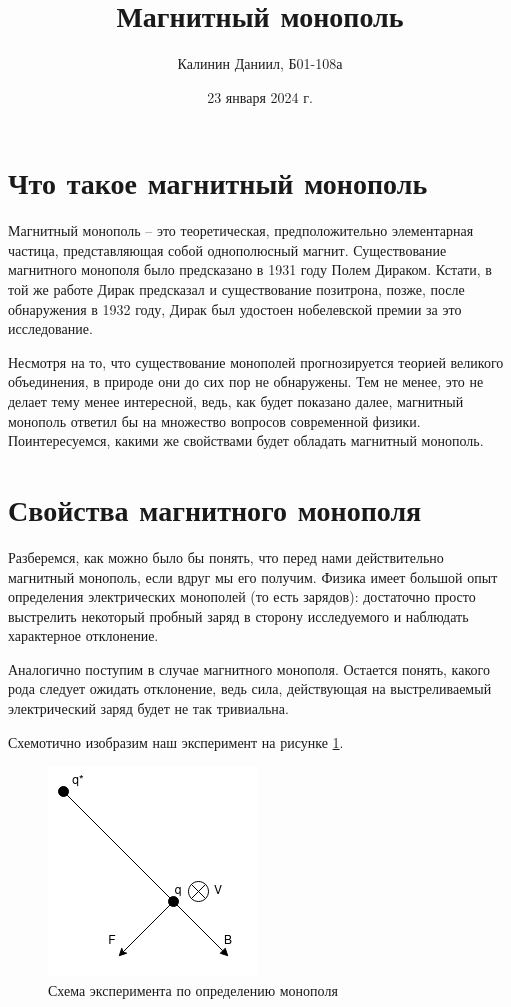 \documentclass[a4paper, 12pt]{article}
\author{Калинин Даниил, Б01-108а}
\date{23 января 2024 г.}
\title{Магнитный монополь}
\begin{document}
\maketitle

\newpage

\section{Что такое магнитный монополь}
Магнитный монополь -- это теоретическая, предположительно элементарная частица, представляющая собой однополюсный магнит. Существование магнитного монополя было предсказано в 1931 году Полем Дираком. Кстати, в той же работе Дирак предсказал и существование позитрона, позже, после обнаружения в 1932 году, Дирак был удостоен нобелевской премии за это исследование. 

Несмотря на то, что существование монополей прогнозируется теорией великого объединения, в природе они до сих пор не обнаружены. Тем не менее, это не  делает тему менее интересной, ведь, как будет показано далее, магнитный монополь ответил бы на множество вопросов современной физики. Поинтересуемся, какими же свойствами будет обладать магнитный монополь.

\section{Свойства магнитного монополя}
Разберемся, как можно было бы понять, что перед нами действительно магнитный монополь, если вдруг мы его получим. Физика имеет большой опыт определения электрических монополей (то есть зарядов): достаточно просто выстрелить некоторый пробный заряд в сторону исследуемого и наблюдать характерное отклонение. 

Аналогично поступим в случае магнитного монополя. Остается понять, какого рода следует ожидать отклонение, ведь сила, действующая на выстреливаемый электрический заряд будет не так тривиальна.

Схемотично изобразим наш эксперимент на рисунке \ref{fig:experiment}.

\begin{figure}[h]
    \includegraphics[width=0.4\linewidth]{experiment_setup.png}
    \centering
    \caption{Схема эксперимента по определению монополя}
    \label{fig:experiment}
\end{figure}
\end{document}
